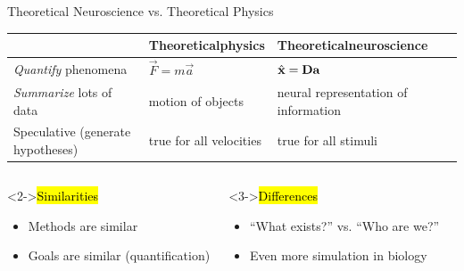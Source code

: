 \documentclass[handout,aspectratio=169]{beamer}
\begin{document}
\begin{frame}{Theoretical Neuroscience vs. Theoretical Physics}

\begin{table}[h]
	\centering
	\begin{tabular}{p{4cm} p{4cm} p{4cm}}
		\toprule
		&
		\textbf{Theoretical\newline physics} & \textbf{Theoretical\newline neuroscience} \\
		\midrule
		\raggedleft\emph{Quantify} phenomena & $\vec{F} = m \vec{a}$ & $\hat{{\mathbf{x}}} = {\mathbf{D}} {\mathbf{a}}$ \\
		\midrule
		\raggedleft \emph{Summarize} lots of data & motion of objects & neural representation of information \\
		\midrule
		\raggedleft Speculative (generate hypotheses) & true for all velocities & true for all stimuli \\
		\bottomrule
	\end{tabular}
	\label{tbl:physics_vs_theoretical_neuroscience}
\end{table}

\begin{columns}[T]
	\begin{block}<2->{\hl{Similarities}}
		\begin{itemize}
			\item Methods are similar
			\item Goals are similar (quantification)
		\end{itemize}
	\end{block}
	\begin{block}<3->{\hl{Differences}}
		\begin{itemize}
			\item \enquote{What exists?} vs. \enquote{Who are we?}
			\item Even more simulation in biology
		\end{itemize}
	\end{block}
\end{columns}
\end{frame}
\end{document}
